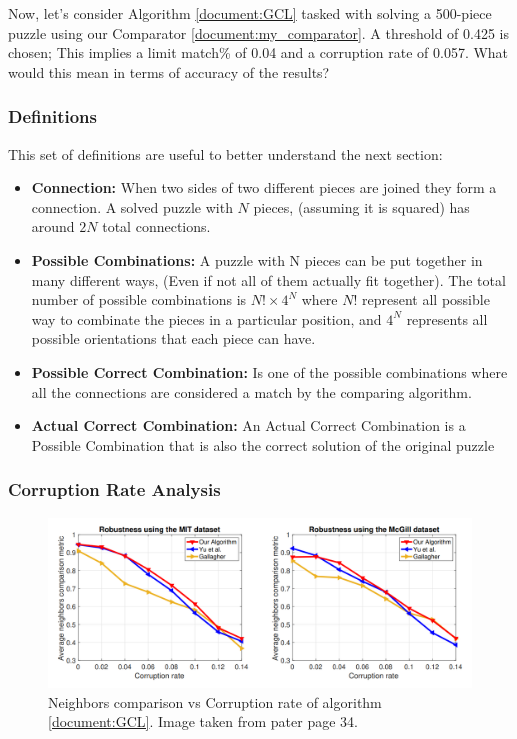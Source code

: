 \documentclass{article}
\begin{document}
Now, let's consider Algorithm \cref{document:GCL} tasked with solving a 500-piece puzzle
using our Comparator \cref{document:my_comparator}.
A threshold of 0.425 is chosen;
This implies a limit match\% of 0.04 and a corruption rate of 0.057.
What would this mean in terms of accuracy of the results?

\subsubsection{Definitions}\label{document:proof_definitions}
This set of definitions are useful to better understand the next section:

\begin{itemize}
  \item \textbf{Connection:}\newline
  When two sides of two different pieces are joined they form a connection.
  A solved puzzle with \(N\) pieces, (assuming it is squared) has around \(2N\) total connections.

  \item \textbf{Possible Combinations:}\newline
  A puzzle with N pieces can be put together in many different ways,
  (Even if not all of 	them actually fit together).
  The total number of possible combinations is \(N! \times 4^N\) where
  \(N!\) represent all possible way to combinate the pieces in a particular position, and
  \(4^N\) represents all possible orientations that each piece can have.
  \item \textbf{Possible Correct Combination:}\newline
  Is one of the possible combinations where all the connections are considered a match
  by the comparing algorithm.
  \item \textbf{Actual Correct Combination:}\newline
  An Actual Correct Combination is a Possible Combination that
  is also the correct solution of the original puzzle	
\end{itemize}

\subsubsection{Corruption Rate Analysis}
\begin{figure}[h]
  \caption{Neighbors comparison vs Corruption rate of algorithm \cref{document:GCL}. Image taken from pater \cite{GCL} page 34.}\label{fig:GCL_Corruption_Rate}
  \centering
  \includegraphics[height=0.35\textwidth]{pictures/corruption_rate.png}
\end{figure}
\end{document}

